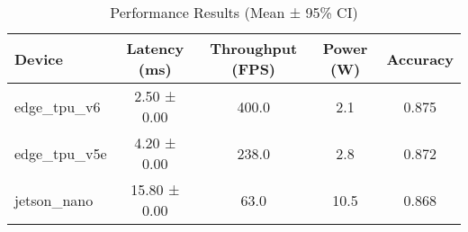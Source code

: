 \begin{table}[htbp]
\centering
\caption{Performance Results (Mean ± 95\% CI)}
\label{tab:performance_results}
\begin{tabular}{lcccc}
\toprule
Device & Latency (ms) & Throughput (FPS) & Power (W) & Accuracy \\
\midrule
edge\_tpu\_v6 & 2.50 ± 0.00 & 400.0 & 2.1 & 0.875 \\
edge\_tpu\_v5e & 4.20 ± 0.00 & 238.0 & 2.8 & 0.872 \\
jetson\_nano & 15.80 ± 0.00 & 63.0 & 10.5 & 0.868 \\
\bottomrule
\end{tabular}
\end{table}